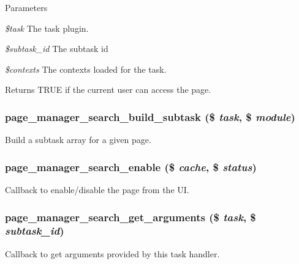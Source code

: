 \begin{DoxyParams}{Parameters}
\item[{\em \$task}]The task plugin. \item[{\em \$subtask\_\-id}]The subtask id \item[{\em \$contexts}]The contexts loaded for the task. \end{DoxyParams}
\begin{DoxyReturn}{Returns}
TRUE if the current user can access the page. 
\end{DoxyReturn}
\hypertarget{search_8inc_a557ba655c3544df1384c33591a5159f8}{
\subsubsection[{page\_\-manager\_\-search\_\-build\_\-subtask}]{\setlength{\rightskip}{0pt plus 5cm}page\_\-manager\_\-search\_\-build\_\-subtask (\$ {\em task}, \/  \$ {\em module})}}
\label{search_8inc_a557ba655c3544df1384c33591a5159f8}
Build a subtask array for a given page. \hypertarget{search_8inc_acbd77cd58f3bb06e7225d54bdd0dd18e}{
\subsubsection[{page\_\-manager\_\-search\_\-enable}]{\setlength{\rightskip}{0pt plus 5cm}page\_\-manager\_\-search\_\-enable (\$ {\em cache}, \/  \$ {\em status})}}
\label{search_8inc_acbd77cd58f3bb06e7225d54bdd0dd18e}
Callback to enable/disable the page from the UI. \hypertarget{search_8inc_a8cd1ec680eb61e9e60fb3c442d835e73}{
\subsubsection[{page\_\-manager\_\-search\_\-get\_\-arguments}]{\setlength{\rightskip}{0pt plus 5cm}page\_\-manager\_\-search\_\-get\_\-arguments (\$ {\em task}, \/  \$ {\em subtask\_\-id})}}
\label{search_8inc_a8cd1ec680eb61e9e60fb3c442d835e73}
Callback to get arguments provided by this task handler.

